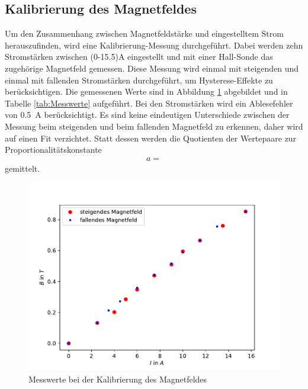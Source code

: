 \subsection{Kalibrierung des Magnetfeldes}
Um den Zusammenhang zwischen Magnetfeldstärke und eingestelltem Strom herauszufinden, wird eine Kalibrierung-Messung durchgeführt. Dabei werden zehn Stromstärken zwischen (0-15.5)\si{\ampere} eingestellt und mit einer Hall-Sonde das zugehörige Magnetfeld gemessen. Diese Messung wird einmal mit steigenden und einmal mit fallenden Stromstärken durchgeführt, um Hysterese-Effekte zu berücksichtigen. Die gemessenen Werte sind in Abbildung \ref{fig:Hysterese} abgebildet und in Tabelle \ref{tab:Messwerte} aufgeführt. Bei den Stromstärken wird ein Ablesefehler von \SI{0.5}{\ampere} berücksichtigt. Es sind keine eindeutigen Unterschiede zwischen der Messung beim steigenden und beim fallenden Magnetfeld zu erkennen, daher wird auf einen Fit verzichtet. Statt dessen werden die Quotienten der Wertepaare zur Proportionalitätskonstante 
\begin{align}
	a = 
\end{align}
gemittelt.

\begin{figure}
	\centering
	\includegraphics[width=\textwidth]{Hysterese.pdf}
	\caption{Messwerte bei der Kalibrierung des Magnetfeldes}
	\label{fig:Hysterese}
\end{figure}


